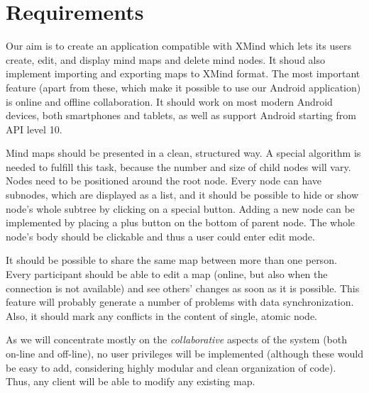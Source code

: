 %
%
%
%
%

\section{Requirements}
\label{sec:requirements}

Our aim is to create an application compatible with XMind which lets its users create, edit, and display mind maps and delete mind nodes. It shoud also implement importing and exporting maps to XMind format. The most important feature (apart from these, which make it possible to use our Android application) is online and offline collaboration. It should work on most modern Android devices, both smartphones and tablets, as well as support Android starting from API level 10. 

Mind maps should be presented in a clean, structured way. A special algorithm is needed to fulfill this task, because the number and size of child nodes will vary. Nodes need to be positioned around the root node. Every node can have subnodes, which are displayed as a list, and it should be possible to hide or show node's whole subtree by clicking on a special button. Adding a new node can be implemented by placing a plus button on the bottom of parent node. The whole node's body should be clickable and thus a user could enter edit mode.

It should be possible to share the same map between more than one person. Every participant should be able to edit a map (online, but also when the connection is not available) and see others' changes as soon as it is possible. This feature will probably generate a number of problems with data synchronization. Also, it should mark any conflicts in the content of single, atomic node.

As we will concentrate mostly on the \emph{collaborative} aspects of the system (both on-line and off-line), no user privileges will be implemented (although these would be easy to add, considering highly modular and clean organization of code). Thus, any client will be able to modify any existing map.
